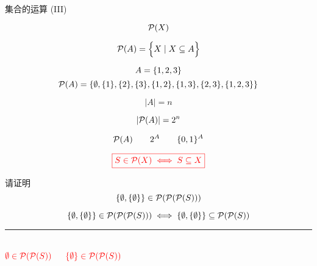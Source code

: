 
\begin{frame}{}
  \begin{center}
    {\Large 集合的运算 (III)}
  \end{center}

  \[
    \mathcal{P}(X)
  \]
\end{frame}

\begin{frame}{}
  \begin{definition}[幂集 (Powerset)]
    \[
      \mathcal{P}(A) = \Big\{X \mid X \subseteq A\Big\}
    \]
  \end{definition}

  \[
    A = \{1, 2, 3\}
  \]
  \[
    \mathcal{P}(A) = \{\emptyset,
      \{1\}, \{2\}, \{3\},
      \{1, 2\}, \{1, 3\}, \{2, 3\},
      \{1, 2, 3\}\}
  \]
\end{frame}

\begin{frame}{}
  \[
    |A| = n
  \]

  \pause
  \[
    |\mathcal{P}(A)| = 2^{n}
  \]

  \pause

  \pause
  \[
    \mathcal{P}(A) \qquad 2^{A} \qquad \{0,1\}^{A}
  \]
\end{frame}

\begin{frame}{}
  \[
    \textcolor{red}{\boxed{S \in \mathcal{P}(X) \iff S \subseteq X}}
  \]
\end{frame}

\begin{frame}{}
  \begin{exampleblock}{请证明}
    \[
      \{\emptyset, \{\emptyset\}\} \in \mathcal{P}(\mathcal{P}(\mathcal{P}(S)))
    \]
  \end{exampleblock}

  \pause
  \[
    \{\emptyset, \{\emptyset\}\} \in \mathcal{P}(\mathcal{P}(\mathcal{P}(S))) \iff \{\emptyset, \{\emptyset\}\} \subseteq \mathcal{P}(\mathcal{P}(S))
  \]

  \pause
  \hrule
  \begin{columns}
      \[
        \textcolor{red}{\emptyset \in \mathcal{P}(\mathcal{P}(S))}
      \]

      \[
        \textcolor{red}{\{\emptyset\} \in \mathcal{P}(\mathcal{P}(S))}
      \]
  \end{columns}
\end{frame}

